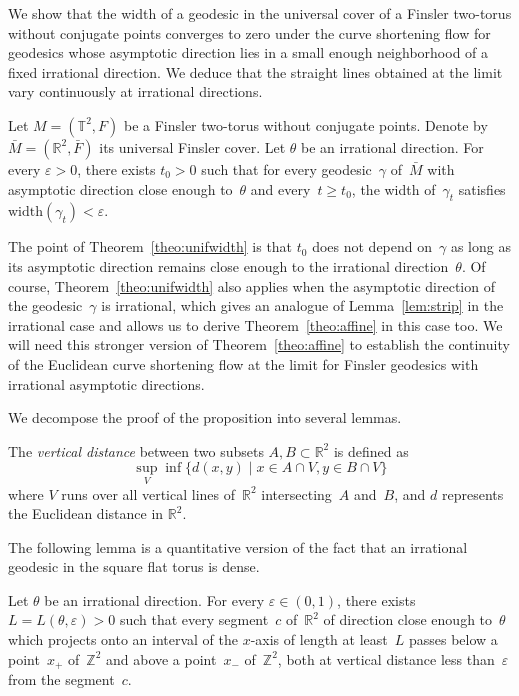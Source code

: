 \documentclass[AHL,Unicode,longabstracts,published]{cedram}
\newcommand{\Z}{\mathbb{Z}}
\newcommand{\R}{\mathbb{R}}
\newcommand{\T}{\mathbb{T}}
\newcommand{\width}{\mathrm{width}}
\begin{document}
We show that the width of a geodesic in the universal cover of a Finsler two-torus without conjugate points converges to zero under the curve shortening flow for geodesics whose asymptotic direction lies in a small enough neighborhood of a fixed irrational direction. We deduce that the straight lines obtained at the limit vary continuously at irrational directions.


\begin{theo}\label{theo:unifwidth}
Let $M=(\T^2,F)$ be a Finsler two-torus without conjugate points. Denote by~$\bar{M}=(\R^2,\bar{F})$ its universal Finsler cover. Let $\theta$ be an irrational direction. For every $\varepsilon>0$, there exists $t_0>0$ such that for every geodesic~$\gamma$ of~$\bar{M}$ with asymptotic direction close enough to~$\theta$ and every~$t \geq t_0$, the width of~$\gamma_t$ satisfies $\width(\gamma_t) < \varepsilon$.
\end{theo}

\begin{rema}
The point of Theorem~\ref{theo:unifwidth} is that $t_0$ does not depend on~$\gamma$ as long as its asymptotic direction remains close enough to the irrational direction~$\theta$. Of course, Theorem~\ref{theo:unifwidth} also applies when the asymptotic direction of the geodesic~$\gamma$ is irrational, which gives an analogue of Lemma~\ref{lem:strip} in the irrational case and allows us to derive Theorem~\ref{theo:affine} in this case too. We will need this stronger version of Theorem~\ref{theo:affine} to establish the continuity of the Euclidean curve shortening flow at the limit for Finsler geodesics with irrational asymptotic directions.
\end{rema}

We decompose the proof of the proposition into several lemmas.

\begin{defi}
The \emph{vertical distance} between two subsets $A, B \subset \R^{2}$ is defined as
\[
\sup_{V} \inf\{d(x,y) \mid x\in A\cap V, y\in B\cap V\}
\]
where $V$ runs over all vertical lines of~$\R^2$ intersecting~$A$ and~$B$, and $d$ represents the Euclidean distance in $\R^{2}$.
\end{defi}

The following lemma is a quantitative version of the fact that an irrational geodesic in the square flat torus is dense.

\begin{lemm}\label{lem:dioph}
Let $\theta$ be an irrational direction. For every $\varepsilon \in (0,1)$, there exists $L=L(\theta,\varepsilon)>0$ such that every segment~$c$ of~$\R^2$ of direction close enough to~$\theta$ which projects onto an interval of the $x$-axis of length at least~$L$ passes below a point~$x_+$ of~$\Z^2$ and above a point~$x_-$ of~$\Z^2$, both at vertical distance less than~$\varepsilon$ from the segment~$c$.
\end{lemm}
\end{document}
